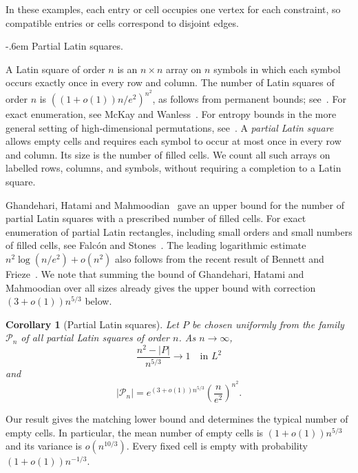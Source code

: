 \documentclass[11pt,reqno]{amsart}
\makeatletter
\numberwithin{equation}{section}
\renewcommand{\paragraph}{\@startsection{paragraph}{4}%
    \z@{.75\linespacing\@plus.2\linespacing\@minus.1\linespacing}%
    {-.6em}%
    {\normalfont\bfseries}}
\theoremstyle{plain}
\newtheorem{corollary}[theorem]{Corollary}
\theoremstyle{definition}
\makeatother
\begin{document}
In these examples, each entry or cell occupies one vertex for each constraint, so compatible entries or cells correspond to disjoint edges.

\paragraph{Partial Latin squares.}

A Latin square of order $n$ is an $n\times n$ array on $n$ symbols in which each symbol occurs exactly once in every row and column.
The number of Latin squares of order $n$ is $((1+o(1))n/e^2)^{n^2}$, as follows from permanent bounds; see~\cite[Theorem~17.3]{vanLintWilson}.
For exact enumeration, see McKay and Wanless~\cite{McKayWanless}.
For entropy bounds in the more general setting of high-dimensional permutations, see~\cite{LinialLuriaPermutations}.
A \emph{partial Latin square} allows empty cells and requires each symbol to occur at most once in every row and column.
Its size is the number of filled cells.
We count all such arrays on labelled rows, columns, and symbols, without requiring a completion to a Latin square.

Ghandehari, Hatami and Mahmoodian~\cite[Theorem~3]{GHM} gave an upper bound for the number of partial Latin squares with a prescribed number of filled cells.
For exact enumeration of partial Latin rectangles, including small orders and small numbers of filled cells, see Falc\'on and Stones~\cite{FalconStones}.
The leading logarithmic estimate $n^2 \log (n/e^2) +o(n^2)$ also follows from the recent result of Bennett and Frieze~\cite[Theorem~4(b)]{BF}.
We note that summing the bound of Ghandehari, Hatami and Mahmoodian over all sizes already gives the upper bound with correction $(3+o(1))n^{5/3}$ below.

\begin{corollary}[Partial Latin squares]\label{cor:partiallatin}
    Let $P$ be chosen uniformly from the family $\mathcal{P}_n$ of all partial Latin squares of order $n$.
    As $n\to\infty$,
    \[
        \frac{n^2-|P|}{n^{5/3}}\longrightarrow1\quad\text{in }L^2
    \]
    and
    \[
        |\mathcal{P}_n| =  e^{(3 + o(1))n^{5/3}} \left( \frac{n}{e^2} \right)^{n^2}.
    \]
\end{corollary}

Our result gives the matching lower bound and determines the typical number of empty cells.
In particular, the mean number of empty cells is $(1+o(1))n^{5/3}$ and its variance is $o(n^{10/3})$.
Every fixed cell is empty with probability $(1+o(1))n^{-1/3}$.
\end{document}
